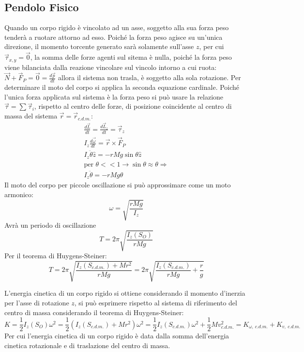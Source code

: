 \documentclass{article}
\numberwithin{equation}{subsection}
\begin{document}
\subsection{Pendolo Fisico}
Quando un corpo rigido è vincolato ad un asse, soggetto 
alla sua forza peso tenderà a ruotare attorno ad esso. 
Poiché la forza peso agisce su un'unica direzione, il momento torcente generato sarà solamente sull'asse $z$, per cui $\vec{\tau}_{x,y}=\vec{0}$, 
la somma delle forze agenti sul sitema è nulla, poiché 
la forza peso viene bilanciata dalla reazione vincolare sul vincolo intorno a cui ruota: $\vec{N}+\vec{F}_P=\vec{0}=\displaystyle\frac{d\vec{p}}{dt}$ 
allora il sistema non trasla, è soggetto alla sola rotazione. 
Per determinare il moto del corpo si applica la seconda 
equazione cardinale. Poiché l'unica forza applicata sul sistema è la forza peso si può usare la relazione $\vec{\tau}=\sum\vec{\tau}_i$, rispetto al 
centro delle forze, di posizione coincidente al centro di massa del sistema $\vec{r}=\vec{r}_{c.d.m.}$:
\begin{gather*}
    \displaystyle\frac{d\vec{L}}{dt}=\frac{d\vec{L}_z}{dt}=\vec{\tau}_z\\
    I_z\displaystyle\frac{d\vec{\omega}}{dt}=\vec{r}\times\vec{F}_P\\
    I_z\ddot\theta\hat{z}=-rMg\sin\theta\hat{z}\\
    \mbox{per }\theta<<1\rightarrow \sin\theta\approx\theta\Rightarrow\\
    I_z\ddot\theta=-rMg\theta
\end{gather*}
Il moto del corpo per piccole oscillazione si può approssimare come un moto armonico: 
\begin{equation}
    \omega=\displaystyle\sqrt{\displaystyle\frac{rMg}{I_z}}
\end{equation}
Avrà un periodo di oscillazione 
\begin{equation*}
    T=2\pi\displaystyle\sqrt{\frac{I_z(S_O)}{rMg}}
\end{equation*}
Per il teorema di Huygens-Steiner: 
\begin{equation}
    T=2\pi\sqrt{\frac{I_z(S_{c.d.m.})+Mr^2}{rMg}}=2\pi\sqrt{\frac{I_z(S_{c.d.m.})}{rMg}+\frac{r}{g}}
\end{equation}


L'energia cinetica di un corpo rigido si ottiene considerando il momento d'inerzia per l'asse di rotazione $z$, si può esprimere rispetto al sistema di riferimento 
del centro di massa considerando il teorema di Huygens-Steiner:
\begin{equation*}
    K=\displaystyle\frac{1}{2}I_z(S_O)\omega^2=\frac{1}{2}(I_z(S_{c.d.m.})+Mr^2)\omega^2=\frac{1}{2}I_z(S_{c.d.m.})\omega^2+\frac{1}{2}Mv_{c.d.m.}^2=K_{\omega,\:c.d.m.}+K_{v,\:c.d.m.}
\end{equation*}
Per cui l'energia cinetica di un corpo rigido è data dalla somma dell'energia cinetica rotazionale e di traslazione del centro di massa. 
\end{document}
